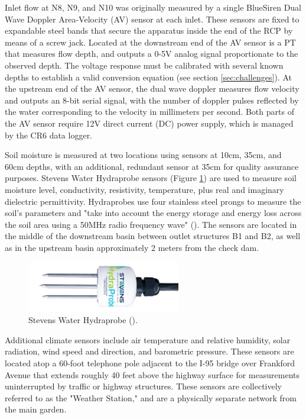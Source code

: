 Inlet flow at N8, N9, and N10 was originally measured by a single BlueSiren Dual Wave Doppler Area-Velocity (AV) sensor at each inlet.
These sensors are fixed to expandable steel bands that secure the apparatus inside the end of the RCP by means of a screw jack.
Located at the downstream end of the AV sensor is a PT that measures flow depth, and outputs a 0-5V analog signal proportionate to the observed depth.
The voltage response must be calibrated with several known depths to establish a valid conversion equation (see section \ref{sec:challenges}).
At the upstream end of the AV sensor, the dual wave doppler measures flow velocity and outputs an 8-bit serial signal, with the number of doppler pulses reflected by the water corresponding to the velocity in millimeters per second.
Both parts of the AV sensor require 12V direct current (DC) power supply, which is managed by the CR6 data logger.

Soil moisture is measured at two locations using sensors at 10cm, 35cm, and 60cm depths, with an additional, redundant sensor at 35cm for quality assurance purposes.
Stevens Water Hydraprobe sensors (Figure \ref{fig:hydraprobe}) are used to measure soil moisture level, conductivity, resistivity, temperature, plus real and imaginary dielectric permittivity.
Hydraprobes use four stainless steel prongs to measure the soil's parameters and "take into account the energy storage and energy loss across the soil area using a 50MHz radio frequency wave" (\cite{StevensWater}).
The sensors are located in the middle of the downstream basin between outlet structures B1 and B2, as well as in the upstream basin approximately 2 meters from the check dam.

\begin{figure}[ht!]
	\centering
	\includegraphics[width=0.6\textwidth]{gfx/chapter-instrumentation/hydraprobe.png}
	\caption[Steven's Water Hydraprobe.]{Stevens Water Hydraprobe (\cite{StevensWater}).}
	\label{fig:hydraprobe}
\end{figure}

Additional climate sensors include air temperature and relative humidity, solar radiation, wind speed and direction, and barometric pressure.
These sensors are located atop a 60-foot telephone pole adjacent to the I-95 bridge over Frankford Avenue that extends roughly 40 feet above the highway surface for measurements uninterrupted by traffic or highway structures.
These sensors are collectively referred to as the "Weather Station," and are a physically separate network from the main garden.

